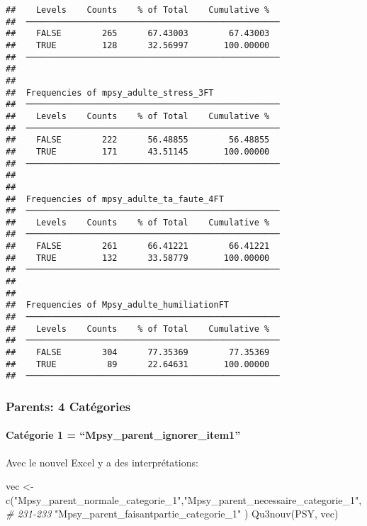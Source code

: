 \documentclass[
]{article}
\newenvironment{Shaded}{\begin{snugshade}}{\end{snugshade}}
\newcommand{\CommentTok}[1]{\textcolor[rgb]{0.56,0.35,0.01}{\textit{#1}}}
\newcommand{\FunctionTok}[1]{\textcolor[rgb]{0.00,0.00,0.00}{#1}}
\newcommand{\NormalTok}[1]{#1}
\newcommand{\OtherTok}[1]{\textcolor[rgb]{0.56,0.35,0.01}{#1}}
\newcommand{\StringTok}[1]{\textcolor[rgb]{0.31,0.60,0.02}{#1}}
\begin{document}
\begin{verbatim}
##    Levels    Counts    % of Total    Cumulative %   
##  ────────────────────────────────────────────────── 
##    FALSE        265      67.43003        67.43003   
##    TRUE         128      32.56997       100.00000   
##  ────────────────────────────────────────────────── 
## 
## 
##  Frequencies of mpsy_adulte_stress_3FT              
##  ────────────────────────────────────────────────── 
##    Levels    Counts    % of Total    Cumulative %   
##  ────────────────────────────────────────────────── 
##    FALSE        222      56.48855        56.48855   
##    TRUE         171      43.51145       100.00000   
##  ────────────────────────────────────────────────── 
## 
## 
##  Frequencies of mpsy_adulte_ta_faute_4FT            
##  ────────────────────────────────────────────────── 
##    Levels    Counts    % of Total    Cumulative %   
##  ────────────────────────────────────────────────── 
##    FALSE        261      66.41221        66.41221   
##    TRUE         132      33.58779       100.00000   
##  ────────────────────────────────────────────────── 
## 
## 
##  Frequencies of Mpsy_adulte_humiliationFT           
##  ────────────────────────────────────────────────── 
##    Levels    Counts    % of Total    Cumulative %   
##  ────────────────────────────────────────────────── 
##    FALSE        304      77.35369        77.35369   
##    TRUE          89      22.64631       100.00000   
##  ──────────────────────────────────────────────────
\end{verbatim}

\hypertarget{parents-4-catuxe9gories}{%
\subsubsection{Parents: 4 Catégories}\label{parents-4-catuxe9gories}}

\hypertarget{catuxe9gorie-1-mpsy_parent_ignorer_item1}{%
\paragraph{Catégorie 1 =
``Mpsy\_parent\_ignorer\_item1''}\label{catuxe9gorie-1-mpsy_parent_ignorer_item1}}

Avec le nouvel Excel y a des interprétations:

\begin{Shaded}
\begin{Highlighting}[]
\NormalTok{vec }\OtherTok{\textless{}{-}} \FunctionTok{c}\NormalTok{(}\StringTok{"Mpsy\_parent\_normale\_categorie\_1"}\NormalTok{,}\StringTok{"Mpsy\_parent\_necessaire\_categorie\_1"}\NormalTok{,  }\CommentTok{\# 231{-}233}
    \StringTok{"Mpsy\_parent\_faisantpartie\_categorie\_1"}
\NormalTok{     )}
\FunctionTok{Qu3nouv}\NormalTok{(PSY, vec)}
\end{Highlighting}
\end{Shaded}
\end{document}
